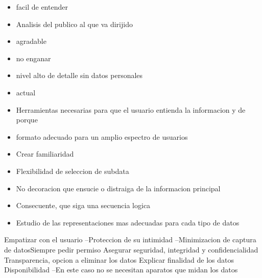 \begin{itemize}
\item facil de entender
\item Analisis del publico al que va dirijido
\item agradable
\item no enganar
\item nivel alto de detalle sin datos personales
\item actual
\item Herramientas necesarias para que el usuario entienda la informacion y de porque
\item formato adecuado para un amplio espectro de usuarios
\item Crear familiaridad
\item Flexibilidad de seleccion de subdata
\item No decoracion que ensucie o distraiga de la informacion principal
\item Consecuente, que siga una secuencia logica
\item Estudio de las representaciones mas adecuadas para cada tipo de datos
  \end{itemize}

  Empatizar con el usuario
  --Proteccion de su intimidad
  --Minimizacion de captura de datosSiempre pedir permiso
  Asegurar seguridad, integridad y confidencialidad
  Transparencia, opcion a eliminar los datos
  Explicar finalidad de los datos\\
  Disponibilidad --En este caso no se necesitan aparatos que midan los datos
  